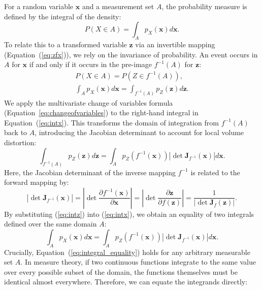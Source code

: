 For a random variable $\boldsymbol{x}$ and a measurement set $A$, the probability measure is defined by the integral of the density:
\begin{equation}
    P(X\in A)=\int_A p_X(\boldsymbol{x})d\boldsymbol{x}.
\end{equation}
To relate this to a transformed variable $\boldsymbol{z}$ via an invertible mapping (Equation~(\ref{eq:zfx})), we rely on the invariance of probability. An event occurs in $A$ for $\boldsymbol{x}$ if and only if it occurs in the pre-image $f^{-1}(A)$ for $\boldsymbol{z}$:
\begin{subequations}
    \begin{gather}
        P(X\in A)=P(Z\in f^{-1}(A)),\\
        \label{eq:intx}
        \int_A p_X(\boldsymbol{x})d\boldsymbol{x}=\int_{f^{-1}(A)}p_Z(\boldsymbol{z})d\boldsymbol{z}.
    \end{gather}
\end{subequations}
We apply the multivariate change of variables formula (Equation~\ref{eq:changeofvariables}) to the right-hand integral in Equation~(\ref{eq:intx}). This transforms the domain of integration from $f^{-1}(A)$ back to $A$, introducing the Jacobian determinant to account for local volume distortion:
\begin{equation}
    \label{eq:intz}
    \int_{f^{-1}(A)}p_Z(\boldsymbol{z})d\boldsymbol{z}=\int_A p_Z(f^{-1}(\boldsymbol{x}))\left|\det\boldsymbol{J}_{f^{-1}}(\boldsymbol{x})\right|d\boldsymbol{x}.
\end{equation}
Here, the Jacobian determinant of the inverse mapping $f^{-1}$ is related to the forward mapping by:
\begin{equation}
    \left|\det\boldsymbol{J}_{f^{-1}}(\boldsymbol{x})\right|=\left|\det\frac{\partial f^{-1}(\boldsymbol{x})}{\partial\boldsymbol{x}}\right|=\left|\det\frac{\partial\boldsymbol{z}}{\partial f(\boldsymbol{z})}\right|=\frac{1}{\left|\det\boldsymbol{J}_f(\boldsymbol{z})\right|}.
\end{equation}
By substituting (\ref{eq:intz}) into (\ref{eq:intx}), we obtain an equality of two integrals defined over the same domain $A$:
\begin{equation}
    \label{eq:integral_equality}
    \int_A p_X(\boldsymbol{x})d\boldsymbol{x}=\int_A p_Z(f^{-1}(\boldsymbol{x}))\left|\det\boldsymbol{J}_{f^{-1}}(\boldsymbol{x})\right|d\boldsymbol{x}.
\end{equation}
Crucially, Equation~(\ref{eq:integral_equality}) holds for any arbitrary measurable set $A$. In measure theory, if two continuous functions integrate to the same value over every possible subset of the domain, the functions themselves must be identical almost everywhere. Therefore, we can equate the integrands directly:

